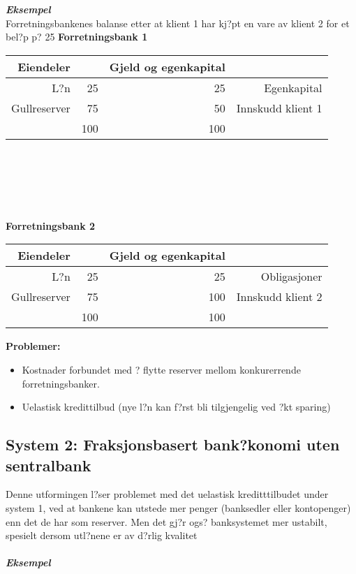 \documentclass[a4paper,notitlepage]{article}
\begin{document}
\noindent\textbf{\emph{Eksempel}}\\
Forretningsbankenes balanse etter at klient 1 har kj?pt en vare av klient 2 for et bel?p p? 25
\noindent \textbf{Forretningsbank 1}
\begin{center}
\begin{tabular}{rrrr}
    \textbf{Eiendeler} & \textbf{} & \textbf{Gjeld og egenkapital} & \textbf{} \\
\hline    L?n   & 25    & 25    & Egenkapital \\
    Gullreserver & 75    & 50    & Innskudd klient 1 \\
\hline          & 100    & 100    &  \\
\end{tabular}%
\end{center}

\noindent \textbf{\\ \\ \\ \\ \\ Forretningsbank 2}
\begin{center}

\begin{tabular}{rrrr}
    \textbf{Eiendeler} & \textbf{} & \textbf{Gjeld og egenkapital} & \textbf{} \\
\hline    L?n   & 25    & 25    & Obligasjoner \\
    Gullreserver & 75    & 100    & Innskudd klient 2 \\
\hline          & 100    & 100    &  \\
\end{tabular}%
\end{center}
\noindent\textbf{Problemer:}\\
\begin{itemize}
\item Kostnader forbundet med ? flytte reserver mellom konkurerrende forretningsbanker.
\item Uelastisk kredittilbud (nye l?n kan f?rst bli tilgjengelig ved ?kt sparing)
\end{itemize}
\subsection{System 2: Fraksjonsbasert bank?konomi uten sentralbank}
Denne utformingen l?ser problemet med det uelastisk kreditttilbudet under system 1, ved at bankene kan utstede mer penger (banksedler eller kontopenger) enn det de har som reserver. Men det gj?r ogs? banksystemet mer ustabilt, spesielt dersom utl?nene er av d?rlig kvalitet\\
\noindent\textbf{\emph{\\ Eksempel}}\\
\end{document}
